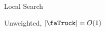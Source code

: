 \begin{frame}
\vfill
\begin{center}
\Huge 
Local Search

\vspace{1cm}

\huge
Unweighted, $|\text{\faTruck}| = O(1)$
\end{center}
\vfill
\end{frame}